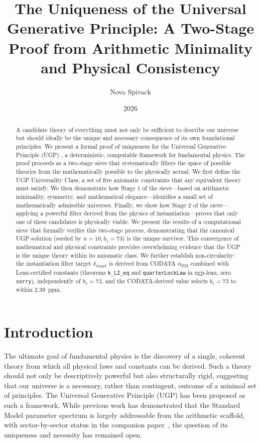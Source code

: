 \documentclass[11pt,twocolumn]{article}
\title{\bfseries The Uniqueness of the Universal Generative Principle: A Two-Stage Proof from Arithmetic Minimality and Physical Consistency}
\author[1]{Nova Spivack}
\date{2026}
\theoremstyle{remark}
\begin{document}
\maketitle
\NovaZenodoAfterTitle

\begin{abstract}
A candidate theory of everything must not only be sufficient to describe our universe but should ideally be the unique and necessary consequence of its own foundational principles. We present a formal proof of uniqueness for the Universal Generative Principle (UGP) \cite{SpivackUGPFormalization,ugp-lean}, a deterministic, computable framework for fundamental physics. The proof proceeds as a two-stage sieve that systematically filters the space of possible theories from the mathematically possible to the physically actual. We first define the UGP Universality Class, a set of five axiomatic constraints that any equivalent theory must satisfy. We then demonstrate how Stage 1 of the sieve—based on arithmetic minimality, symmetry, and mathematical elegance—identifies a small set of mathematically admissible universes. Finally, we show how Stage 2 of the sieve—applying a powerful filter derived from the physics of instantiation—proves that only one of these candidates is physically viable. We present the results of a computational sieve that formally verifies this two-stage process, demonstrating that the canonical UGP solution (seeded by $n=10, b_1=73$) is the unique survivor. This convergence of mathematical and physical constraints provides overwhelming evidence that the UGP is the unique theory within its axiomatic class. We further establish non-circularity: the instantiation filter target $\delta_{\text{target}}$ is derived from CODATA $\alpha_{\text{EM}}$ combined with Lean-certified constants (theorems \texttt{k\_L2\_eq} and \texttt{quarterLockLaw} in ugp-lean, zero \texttt{sorry}), independently of $b_1=73$, and the CODATA-derived value selects $b_1=73$ to within 2.39~ppm.
\end{abstract}

\tableofcontents

\section{Introduction}
The ultimate goal of fundamental physics is the discovery of a single, coherent theory from which all physical laws and constants can be derived. Such a theory should not only be descriptively powerful but also structurally rigid, suggesting that our universe is a necessary, rather than contingent, outcome of a minimal set of principles. The Universal Generative Principle (UGP) has been proposed as such a framework. While previous work has demonstrated that the Standard Model parameter spectrum is largely addressable from the arithmetic scaffold, with sector-by-sector status in the companion paper~\cite{Spivack2026_SM_UGP}, the question of its uniqueness and necessity has remained open.
\end{document}

